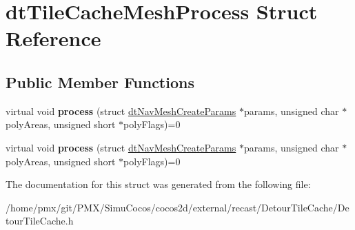 \hypertarget{structdtTileCacheMeshProcess}{}\section{dt\+Tile\+Cache\+Mesh\+Process Struct Reference}
\label{structdtTileCacheMeshProcess}
\subsection*{Public Member Functions}
\begin{DoxyCompactItemize}
\item 
\mbox{\label{structdtTileCacheMeshProcess_a215d535bec3a568d5fdb0b8ebe8cd609}} 
virtual void {\bfseries process} (struct \hyperlink{structdtNavMeshCreateParams}{dt\+Nav\+Mesh\+Create\+Params} $\ast$params, unsigned char $\ast$poly\+Areas, unsigned short $\ast$poly\+Flags)=0
\item 
\mbox{\label{structdtTileCacheMeshProcess_a215d535bec3a568d5fdb0b8ebe8cd609}} 
virtual void {\bfseries process} (struct \hyperlink{structdtNavMeshCreateParams}{dt\+Nav\+Mesh\+Create\+Params} $\ast$params, unsigned char $\ast$poly\+Areas, unsigned short $\ast$poly\+Flags)=0
\end{DoxyCompactItemize}


The documentation for this struct was generated from the following file\+:\begin{DoxyCompactItemize}
\item 
/home/pmx/git/\+P\+M\+X/\+Simu\+Cocos/cocos2d/external/recast/\+Detour\+Tile\+Cache/Detour\+Tile\+Cache.\+h\end{DoxyCompactItemize}
